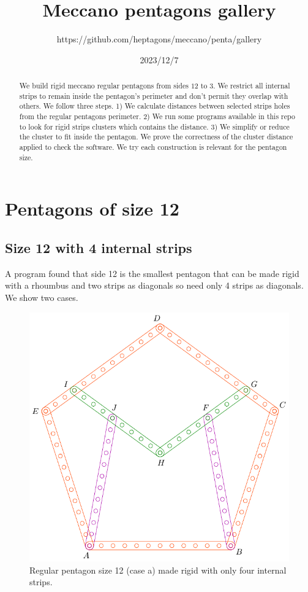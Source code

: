 \documentclass[11pt]{article}
\title{Meccano pentagons gallery}
\author{https://github.com/heptagons/meccano/penta/gallery}
\date{2023/12/7}
\begin{document}
\maketitle
\begin{abstract}
We build rigid meccano regular pentagons from sides $12$ to $3$. We restrict all internal strips to remain inside the pentagon's perimeter and don't permit they overlap with others. We follow three steps. 1) We calculate distances between selected strips holes from the regular pentagons perimeter. 2) We run some programs available in this repo to look for rigid strips clusters which contains the distance. 3) We simplify or reduce the cluster to fit inside the pentagon. We prove the correctness of the cluster distance applied to check the software. We try each construction is relevant for the pentagon size.
\end{abstract}

\section{Pentagons of size 12}

\subsection{Size 12 with 4 internal strips}

A program found that side 12 is the smallest pentagon that can be made rigid with a rhoumbus and two strips as diagonals so need only 4 strips as diagonals. We show two cases.

\begin{figure}[h]
 \centering
 \includegraphics[scale=0.8]{12/penta12a}
 \caption{Regular pentagon size 12 (case a) made rigid with only four internal strips.}
 \label{fig:penta12a}
\end{figure}
\end{document}

